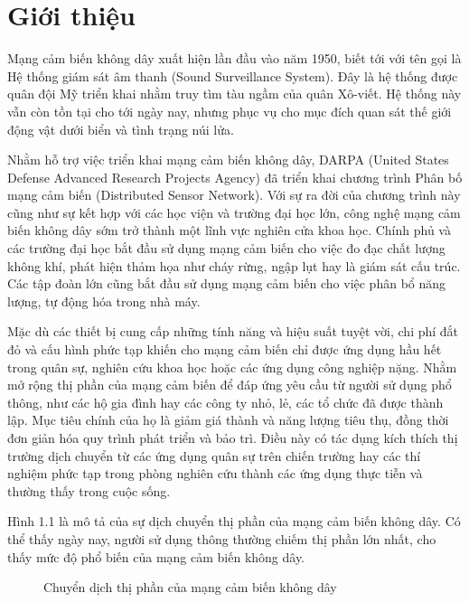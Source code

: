 \chapter{Giới thiệu}
Mạng cảm biến không dây xuất hiện lần đầu vào năm 1950, biết tới với tên gọi là Hệ thống giám sát âm thanh (Sound Surveillance System). Đây là hệ thống được quân đội Mỹ triển khai nhằm truy tìm tàu ngầm của quân Xô-viết. Hệ thống này vẫn còn tồn tại cho tới ngày nay, nhưng phục vụ cho mục đích quan sát thế giới động vật dưới biển và tình trạng núi lửa.


Nhằm hỗ trợ việc triển khai mạng cảm biến không dây, DARPA (United States Defense Advanced Research Projects Agency) đã triển khai chương trình Phân bố mạng cảm biến (Distributed Sensor Network). Với sự ra đời của chương trình này cũng như sự kết hợp với các học viện và trường đại học lớn, công nghệ mạng cảm biến không dây sớm trở thành một lĩnh vực nghiên cửa khoa học. Chính phủ và các trường đại học bắt đầu sử dụng mạng cảm biến cho việc đo đạc chất lượng không khí, phát hiện thảm họa như cháy rừng, ngập lụt hay là giám sát cấu trúc. Các tập đoàn lớn cũng bắt đầu sử dụng mạng cảm biến cho việc phân bổ năng lượng, tự động hóa trong nhà máy.


Mặc dù các thiết bị cung cấp những tính năng và hiệu suất tuyệt vời, chi phí đắt đỏ và cấu hình phức tạp khiến cho mạng cảm biến chỉ được ứng dụng hầu hết trong quân sự, nghiên cứu khoa học hoặc các ứng dụng công nghiệp nặng. Nhằm mở rộng thị phần của mạng cảm biến để đáp ứng yêu cầu từ người sử dụng phổ thông, như các hộ gia đình hay các công ty nhỏ, lẻ, các tổ chức đã được thành lập. Mục tiêu chính của họ là giảm giá thành và năng lượng tiêu thụ, đồng thời đơn giản hóa quy trình phát triển và bảo trì. Điều này có tác dụng kích thích thị trường dịch chuyển từ các ứng dụng quân sự trên chiến trường hay các thí nghiệm phức tạp trong phòng nghiên cứu thành các ứng dụng thực tiễn và thường thấy trong cuộc sống. \cite{benefit1evolution}

 
Hình 1.1 là mô tả của sự dịch chuyển thị phần của mạng cảm biến không dây. Có thể thấy ngày nay, người sử dụng thông thường chiếm thị phần lớn nhất, cho thấy mức độ phổ biến của mạng cảm biến không dây.


\begin{figure}[htb]
	\caption{\label{fig:my-label} Chuyển dịch thị phần của mạng cảm biến không dây}
\end{figure}

